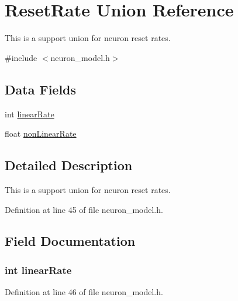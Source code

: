 \hypertarget{union_reset_rate}{}\section{Reset\+Rate Union Reference}
\label{union_reset_rate}


This is a support union for neuron reset rates.  




{\ttfamily \#include $<$neuron\+\_\+model.\+h$>$}

\subsection*{Data Fields}
\begin{DoxyCompactItemize}
\item 
int \hyperlink{union_reset_rate_a4bf8a23e4a9874ff73208c681eae1ced}{linear\+Rate}
\item 
float \hyperlink{union_reset_rate_a54aaba14ce85fd9c5d7b385d98727e36}{non\+Linear\+Rate}
\end{DoxyCompactItemize}


\subsection{Detailed Description}
This is a support union for neuron reset rates. 



Definition at line 45 of file neuron\+\_\+model.\+h.



\subsection{Field Documentation}
\hypertarget{union_reset_rate_a4bf8a23e4a9874ff73208c681eae1ced}{}
\subsubsection[{linear\+Rate}]{\setlength{\rightskip}{0pt plus 5cm}int linear\+Rate}\label{union_reset_rate_a4bf8a23e4a9874ff73208c681eae1ced}


Definition at line 46 of file neuron\+\_\+model.\+h.

\hypertarget{union_reset_rate_a54aaba14ce85fd9c5d7b385d98727e36}{}
